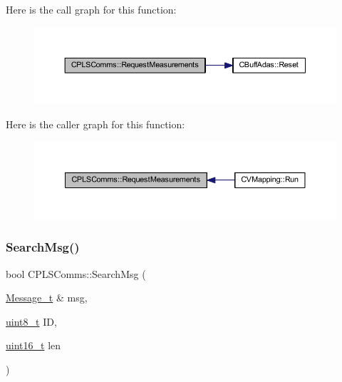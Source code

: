 Here is the call graph for this function\+:\nopagebreak
\begin{figure}[H]
\begin{center}
\leavevmode
\includegraphics[width=350pt]{class_c_p_l_s_comms_ae8f7e9acdf4243b76f3c7f61cf766cfc_cgraph}
\end{center}
\end{figure}
Here is the caller graph for this function\+:\nopagebreak
\begin{figure}[H]
\begin{center}
\leavevmode
\includegraphics[width=350pt]{class_c_p_l_s_comms_ae8f7e9acdf4243b76f3c7f61cf766cfc_icgraph}
\end{center}
\end{figure}
\mbox{\label{class_c_p_l_s_comms_ae0cd51de8a24b261389b6f89b4b80e51}} 
\subsubsection{\texorpdfstring{Search\+Msg()}{SearchMsg()}}
{\footnotesize\ttfamily bool C\+P\+L\+S\+Comms\+::\+Search\+Msg (\begin{DoxyParamCaption}\item[{\mbox{\hyperlink{struct_c_p_l_s_comms_1_1_message__t}{Message\+\_\+t}} \&}]{msg,  }\item[{\mbox{\hyperlink{_a_d_a_s___types_8h_aba7bc1797add20fe3efdf37ced1182c5}{uint8\+\_\+t}}}]{ID,  }\item[{\mbox{\hyperlink{_a_d_a_s___types_8h_a1f1825b69244eb3ad2c7165ddc99c956}{uint16\+\_\+t}}}]{len }\end{DoxyParamCaption})}



